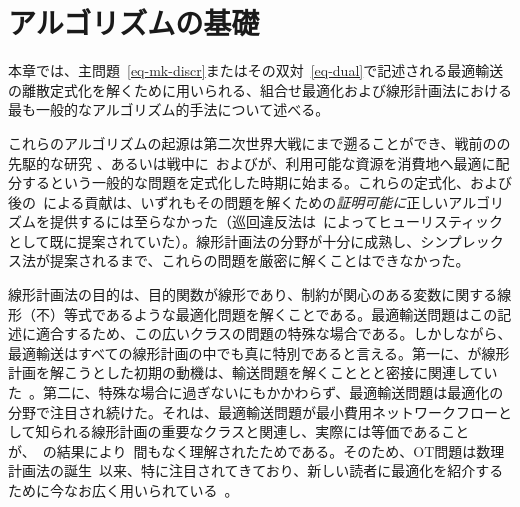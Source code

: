 
\chapter{アルゴリズムの基礎}
\label{c-algo-basics} %

本章では、主問題~\eqref{eq-mk-discr}またはその双対~\eqref{eq-dual}で記述される最適輸送の離散定式化を解くために用いられる、組合せ最適化および線形計画法における最も一般的なアルゴリズム的手法について述べる。

これらのアルゴリズムの起源は第二次世界大戦にまで遡ることができ、戦前の\citeauthor{tolstoi1930methods}の先駆的な研究 \citeyearpar{tolstoi1930methods}、あるいは戦中に~\citet{Hitchcock41}および\citet{Kantorovich42}が、利用可能な資源を消費地へ最適に配分するという一般的な問題を定式化した時期に始まる。これらの定式化、および後の~\citet{koopmans1949optimum}による貢献は、いずれもその問題を解くための\emph{証明可能に}正しいアルゴリズムを提供するには至らなかった（巡回違反法は~\citet{tolstoi1939metody}によってヒューリスティックとして既に提案されていた）。線形計画法の分野が十分に成熟し、シンプレックス法が提案されるまで、これらの問題を厳密に解くことはできなかった。

線形計画法の目的は、目的関数が線形であり、制約が関心のある変数に関する線形（不）等式であるような最適化問題を解くことである。最適輸送問題はこの記述に適合するため、この広いクラスの問題の特殊な場合である。しかしながら、最適輸送はすべての線形計画の中でも真に特別であると言える。第一に、\citeauthor{dantzig1991}が線形計画を解こうとした初期の動機は、輸送問題を解くこととと密接に関連していた~\citep[p. 210]{dantzig49econometrica}。第二に、特殊な場合に過ぎないにもかかわらず、最適輸送問題は最適化の分野で注目され続けた。それは、最適輸送問題が最小費用ネットワークフローとして知られる線形計画の重要なクラスと関連し、実際には等価であることが、~\citet{ford1962flows}の結果により~\citep[p. 213, Lem. 9.3]{korte2012combinatorial}間もなく理解されたためである。そのため、OT問題は数理計画法の誕生~\citep{Dantzig51}以来、特に注目されてきており、新しい読者に最適化を紹介するために今なお広く用いられている~\citep[\S1, p. 4]{nocedal}。

